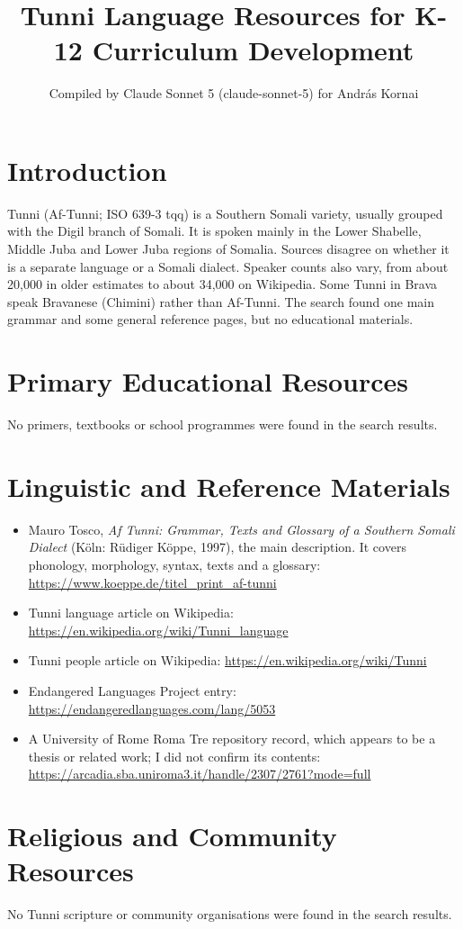 \documentclass[12pt]{article}
\title{Tunni Language Resources for K-12 Curriculum Development}
\author{Compiled by Claude Sonnet 5 (claude-sonnet-5) for Andr\'as Kornai}
\date{}
\begin{document}
\maketitle

\section{Introduction}
Tunni (Af-Tunni; ISO 639-3 tqq) is a Southern Somali variety, usually grouped with the Digil branch of Somali. It is spoken mainly in the Lower Shabelle, Middle Juba and Lower Juba regions of Somalia. Sources disagree on whether it is a separate language or a Somali dialect. Speaker counts also vary, from about 20,000 in older estimates to about 34,000 on Wikipedia. Some Tunni in Brava speak Bravanese (Chimini) rather than Af-Tunni. The search found one main grammar and some general reference pages, but no educational materials.

\section{Primary Educational Resources}
No primers, textbooks or school programmes were found in the search results.

\section{Linguistic and Reference Materials}
\begin{itemize}
\item Mauro Tosco, \emph{Af Tunni: Grammar, Texts and Glossary of a Southern Somali Dialect} (K\"oln: R\"udiger K\"oppe, 1997), the main description. It covers phonology, morphology, syntax, texts and a glossary: \url{https://www.koeppe.de/titel_print_af-tunni}
\item Tunni language article on Wikipedia: \url{https://en.wikipedia.org/wiki/Tunni_language}
\item Tunni people article on Wikipedia: \url{https://en.wikipedia.org/wiki/Tunni}
\item Endangered Languages Project entry: \url{https://endangeredlanguages.com/lang/5053}
\item A University of Rome Roma Tre repository record, which appears to be a thesis or related work; I did not confirm its contents: \url{https://arcadia.sba.uniroma3.it/handle/2307/2761?mode=full}
\end{itemize}

\section{Religious and Community Resources}
No Tunni scripture or community organisations were found in the search results.
\end{document}
